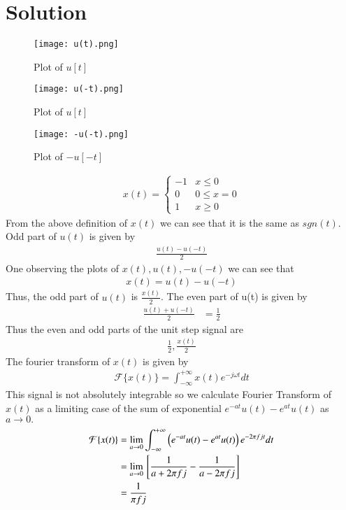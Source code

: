 \documentclass[journal,12pt,twocolumn]{IEEEtran}
\begin{document}
\section{Solution}
\begin{figure}[!ht]
         \centering
         \texttt{[image: u(t).png]}
         \caption{Plot of $u[t]$}
         \label{plot}
\end{figure}
\begin{figure}[!ht]
         \centering
         \texttt{[image: u(-t).png]}
         \caption{Plot of $u[t]$}
         \label{plot}
\end{figure}
\begin{figure}[!ht]
         \centering
         \texttt{[image: -u(-t).png]}
         \caption{Plot of $-u[-t]$}
         \label{plot}
\end{figure}
\begin{align} x(t)=\begin{cases} 
      -1 & x\leq 0 \\
      0 & 0\leq x=0 \\
      1 & x\geq 0
   \end{cases}
\end{align}
From the above definition of $x(t)$ we can see that it is the same as $sgn(t)$.
Odd part of $u(t)$ is given by
\begin{align}
    \frac{u(t)-u(-t)}{2}
\end{align}
One observing the plots of $x(t),u(t),-u(-t)$ we can see that
\begin{align}
    x(t)=u(t)-u(-t)
\end{align}
Thus, the odd part of $u(t)$ is $\frac{x(t)}{2}$.
The even part of u(t) is given by
\begin{align}
 \frac{u(t)+u(-t)}{2} &=\frac{1}{2}  
\end{align}
Thus the even and odd parts of the unit step signal are
\begin{align}
   \frac{1}{2} , \frac{x(t)}{2}
\end{align}
The fourier transform of $x(t)$ is given by
\begin{align}
     \mathcal{F} \{x(t)\}= \int_{ - \infty }^{ + \infty } x(t){e^{ - j\omega t}}dt
\end{align}
This signal is not absolutely integrable so we calculate Fourier Transform of $x(t)$ as a limiting case of the sum of exponential $e^{-at}u(t) - e^{at}u(t)$ as $a \to 0.$
\begin{align}
    \mathcal{F} \{x(t)\}&=\lim_{a \to 0} \int_{ - \infty }^{ + \infty } \left(e^{-at}u(t) - e^{at}u(t)\right){e^{ - 2\pi fj t}}dt\\
    &=\lim_{a \to 0}{}\left[\frac{1}{a  +  2\pi fj}  -  \frac{1}{a  - 2\pi f j}\right]\\
    &=\frac{1}{\pi f j}
\end{align}
\end{document}
